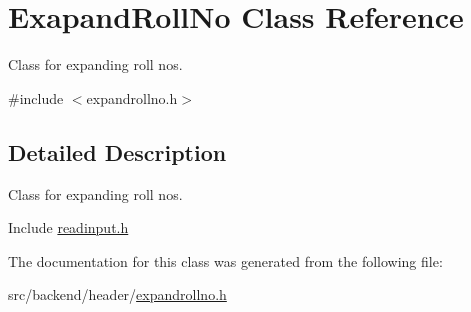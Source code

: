 \hypertarget{classExapandRollNo}{\section{Exapand\-Roll\-No Class Reference}
\label{classExapandRollNo}
}


Class for expanding roll nos.  




{\ttfamily \#include $<$expandrollno.\-h$>$}



\subsection{Detailed Description}
Class for expanding roll nos. 

Include \hyperlink{readinput_8h}{readinput.\-h} 

The documentation for this class was generated from the following file\-:\begin{DoxyCompactItemize}
\item 
src/backend/header/\hyperlink{expandrollno_8h}{expandrollno.\-h}\end{DoxyCompactItemize}
